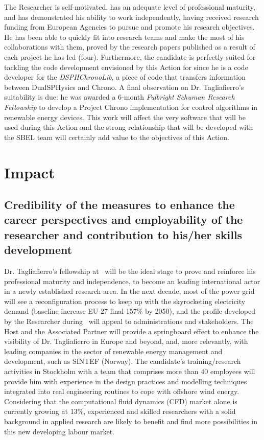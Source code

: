 The Researcher is self-motivated, has an adequate level of professional maturity, and has demonstrated his ability to work independently, having received research funding from European Agencies to pursue and promote his research objectives. He has been able to quickly fit into research teams and make the most of his collaborations with them, proved by the research papers published as a result of each project he has led (four). Furthermore, the candidate is perfectly suited for tackling the code development envisioned by this Action for  since he is a code developer for the \textit{DSPHChronoLib}, a piece of code that transfers information between DualSPHysics and Chrono. A final observation on Dr. Tagliafierro's suitability is due: he was awarded a 6-month \emph{Fulbright Schuman Research Fellowship} to develop a Project Chrono implementation for control algorithms in renewable energy devices. This work will affect the very software that will be used during this Action and the strong relationship that will be developed with the SBEL team will certainly add value to the objectives of this Action.\vspace{-2ex}
\section{Impact }
\vspace{-6pt}
\subsection{Credibility of the measures to enhance the career perspectives and employability of the researcher and contribution to his/her skills development}

Dr. Tagliafierro's fellowship at \UU\ will be the ideal stage to prove and reinforce his professional maturity and independence, to become an leading international actor in a newly established research area. In the next decade, most of the power grid will see a reconfiguration process to keep up with the skyrocketing electricity demand (baseline increase EU-27 final 157\% by 2050), and the profile developed by the Researcher during \nameAction\ will appeal to administrations and stakeholders. The Host and the Associated Partner will provide a springboard effect to enhance the visibility of Dr. Tagliafierro in Europe and beyond, and, more relevantly, with leading companies in the sector of renewable energy management and development, such as SINTEF (Norway). The candidate's training/research activities in Stockholm with a team that comprises more than 40 employees will provide him with experience in the design practices and modelling techniques integrated into real engineering routines to cope with offshore wind energy. Considering that the computational fluid dynamics (CFD) market alone is currently growing at 13\%, experienced and skilled researchers with a solid background in applied research are likely to benefit and find more possibilities in this new developing labour market.\vspace{-2ex} 

